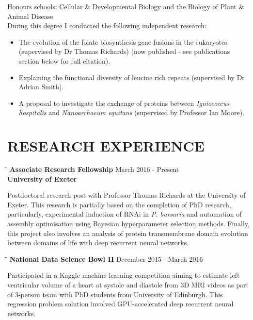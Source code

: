 \documentclass{res}
\begin{document}
\begin{resume}
\begin{tabbing}
   \end{tabbing}\vspace{-20pt}  
Honours schools: Cellular \& Developmental Biology and the Biology of Plant \& Animal Disease\\
During this degree I conducted the following independent research:
\begin{itemize}
        \vspace{-10pt}
    \item The evolution of the folate biosynthesis gene fusions in the eukaryotes (supervised by Dr Thomas Richards) (now published - see publications section below for full citation).
    \item Explaining the functional diversity of leucine rich repeats (supervised by Dr Adrian Smith).
    \item A proposal to investigate the exchange of proteins between  \emph{Igniococcus hospitalis} and  \emph{Nanoarchaeum equitans} (supervised by Professor Ian Moore).
\end{itemize}


\section{RESEARCH EXPERIENCE}

   \vspace{-0.05in} 
   \begin{tabbing}
   \hspace{2in}\= \hspace{2.6in}\= \kill 
   {\bf Associate Research Fellowship} \> \>        March 2016 - Present\\
       \textbf{University of Exeter} \\
     \end{tabbing}\vspace{-20pt}      
    Postdoctoral research post with Professor Thomas Richards at the University of
    Exeter. This research is partially based on the completion of PhD research, particularly,
    experimental induction of RNAi in \textit{P. bursaria} and automation of
    assembly optimisation using Bayesian hyperparameter selection methods. 
    Finally, this project also involves an analysis of protein transmembrane domain
    evolution between domains of life with deep recurrent neural networks.

        \vspace{-0.15in}
   \begin{tabbing}
   \hspace{2in}\= \hspace{2.6in}\= \kill 
    {\bf National Data Science Bowl II} \> \>        December 2015 - March 2016\\
     \end{tabbing}\vspace{-20pt}      
     Participated in a Kaggle machine learning competition aiming to estimate left ventricular volume of a heart at systole and diastole from 3D MRI videos as 
     part of 3-person team with PhD students from University of Edinburgh. 
     This regression problem solution involved GPU-accelerated deep recurrent neural networks.


\end{resume}
\end{document}
